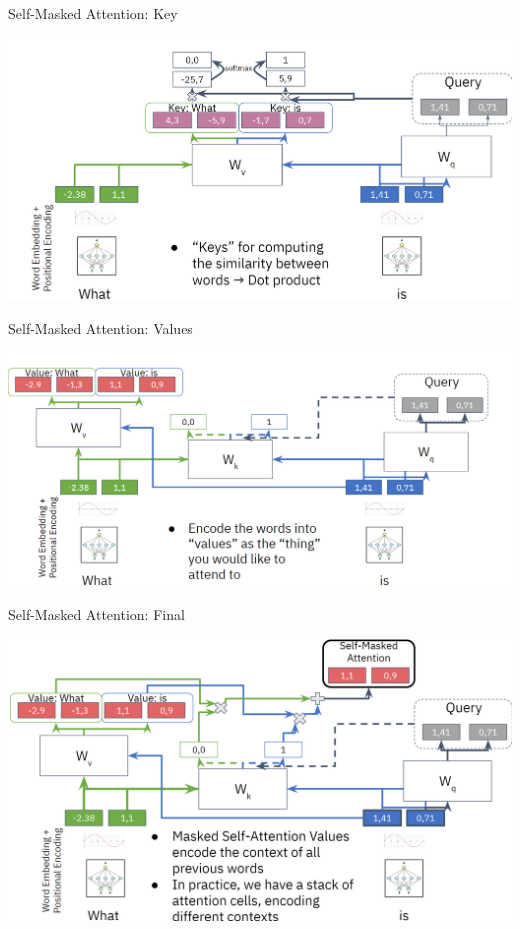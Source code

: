 \documentclass[aspectratio=169]{../latex_main/tntbeamer}  %
\begin{document}
        \begin{frame}{Self-Masked Attention: Key}

            \centering
            \includegraphics[width=0.9\linewidth]{figure/transformer9.png}
        \end{frame}
        \begin{frame}{Self-Masked Attention: Values}

            \centering
            \includegraphics[width=0.9\linewidth]{figure/transformer10.png}
        
        \end{frame}

        \begin{frame}{Self-Masked Attention: Final}

            \centering
            \vspace{-1.2em}
            \includegraphics[width=0.9\linewidth]{figure/transformer11.png}
        
        \end{frame}
\end{document}

